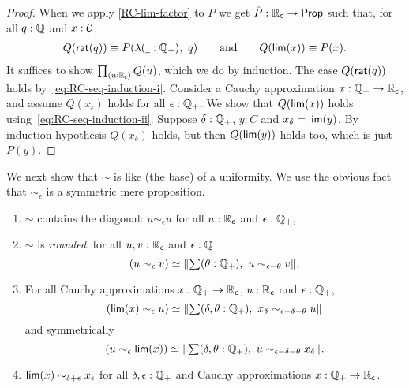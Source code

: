 \begin{proof}
  When we apply \autoref{RC-lim-factor} to $P$ we get $\bar{P} : \mathbb{R}_\mathsf{c} \to \mathsf{Prop}$ such that,
  for all $q : \mathbb{Q}$ and $x : \mathcal{C}$,
  \begin{align*}
    Q(\rcrat(q)) \jdeq P(\lam{\blank : \Qp} q)
    \qquad\text{and}\qquad
    Q(\rclim(x)) \jdeq P(x).
  \end{align*}
  It suffices to show $\prd{u : \RC} Q(u)$, which we do by induction. The case
  $Q(\mathsf{rat}(q))$ holds by~\eqref{eq:RC-seq-induction-i}. Consider a Cauchy approximation
  $x : \mathbb{Q}_{+} \to \mathbb{R}_\mathsf{c}$, and assume $Q(x_\epsilon)$ holds for all $\epsilon : \mathbb{Q}_{+}$. We show
  that $Q(\mathsf{lim}(x))$ holds using~\eqref{eq:RC-seq-induction-ii}. Suppose $\delta : \mathbb{Q}_{+}$,
  $y : C$ and $x_\delta = \mathsf{lim}(y)$. By induction hypothesis $Q(x_\delta)$ holds, but
  then $Q(\mathsf{lim}(y))$ holds too, which is just $P(y)$.
\end{proof}

\noindent
%
We next show that $\sim$ is like (the base) of a uniformity. We use the obvious fact that
$\sim_\epsilon$ is a symmetric mere proposition.

\begin{lem}\label{RC-sim-uniformity-properties}
  \mbox{}
  \begin{enumerate}

  \item \label{RC-sim-diagonal}
    $\sim$ contains the diagonal:
    $u \sim_\epsilon u$ for all $u : \mathbb{R}_\mathsf{c}$ and $\epsilon : \mathbb{Q}_{+}$,

  \item \label{RC-sim-rounded}
    $\sim$ is \emph{rounded}:
    for all $u, v : \mathbb{R}_\mathsf{c}$ and $\epsilon : \mathbb{Q}_{+}$
    \begin{equation*}
      \eqv{
        (u \sim_\epsilon v)
      }{
        \brck{\sm{\theta : \Qp} u \sim_{\epsilon - \theta} v}
      },
    \end{equation*}


  \item \label{RC-sim-lim-rounded}
    For all Cauchy approximations $x : \mathbb{Q}_{+} \to \mathbb{R}_\mathsf{c}$, $u : \mathbb{R}_\mathsf{c}$ and $\epsilon : \mathbb{Q}_{+}$,
    \begin{equation*}
      \eqv{
        (\rclim(x) \sim_\epsilon u)
      }{
        \brck{\sm{\delta, \theta : \Qp} x_\delta \sim_{\epsilon - \delta - \theta} u}
      }
    \end{equation*}
    and symmetrically
    \begin{equation*}
      \eqv{
        (u \sim_\epsilon \rclim(x))
      }{
        \brck{\sm{\delta, \theta : \Qp} u \sim_{\epsilon - \delta - \theta} x_\delta}
      }.
    \end{equation*}
    
  \item \label{RC-sim-self}
    $\mathsf{lim}(x) \sim_{\delta + \epsilon} x_\epsilon$ for all $\delta, \epsilon : \mathbb{Q}_{+}$
    and Cauchy approximations $x : \mathbb{Q}_{+} \to \mathbb{R}_\mathsf{c}$.

  \end{enumerate}
\end{lem}

